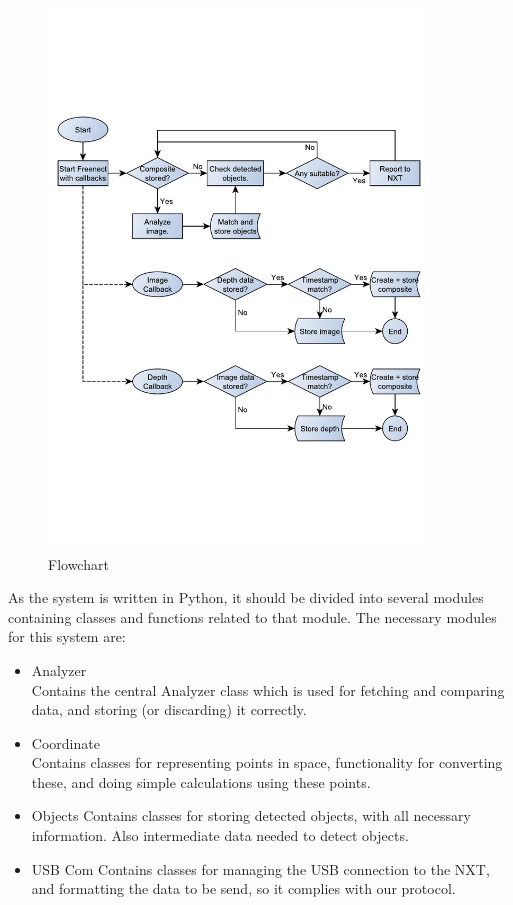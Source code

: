 \begin{figure}[hbtp]
\includegraphics[width=0.90\textwidth]{img/nxtkinectflow.pdf}
\caption{Flowchart} 
\label{fig:nxtkinectflow} 
\end{figure}

As the system is written in Python, it should be divided into several modules containing classes
and functions related to that module. The necessary modules for this system are:
\begin{itemize}
  \item{Analyzer}\\
  Contains the central Analyzer class which is used for fetching and comparing data, and storing (or discarding) it
  correctly.
  \item{Coordinate}\\
  Contains classes for representing points in space, functionality for converting these, and doing simple calculations
  using these points.
  \item{Objects}
  Contains classes for storing detected objects, with all necessary information. Also intermediate data needed to
  detect objects.
  \item{USB Com}
  Contains classes for managing the USB connection to the NXT, and formatting the data to be send, so it complies with
  our protocol.
\end{itemize}


